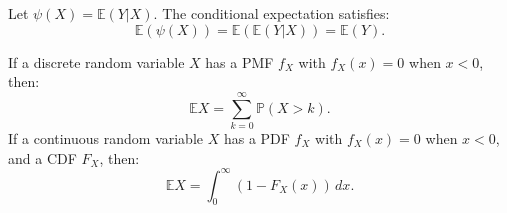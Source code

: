 \documentclass{huhtakm-template-book-v2}
\newcommand{\prob}{\mathbb{P}}
\newcommand{\expect}{\mathbb{E}}
\begin{document}
    \begin{spro}
        Let $\psi(X) = \expect(Y | X)$. The conditional expectation satisfies:
        \begin{equation*}
            \expect(\psi(X)) = \expect(\expect(Y | X)) = \expect(Y).
        \end{equation*}
    \end{spro}
    \begin{spro}
        If a discrete random variable $X$ has a PMF $f_{X}$ with $f_{X}(x) = 0$ when $x < 0$, then:
        \begin{equation*}
            \expect{X} = \sum_{k = 0}^{\infty}\prob(X > k).
        \end{equation*}
        If a continuous random variable $X$ has a PDF $f_{X}$ with $f_{X}(x) = 0$ when $x < 0$, and a CDF $F_{X}$, then:
        \begin{equation*}
            \expect{X} = \int_{0}^{\infty}(1 - F_{X}(x))\,dx.
        \end{equation*}
    \end{spro}
    \newpage
\end{document}
